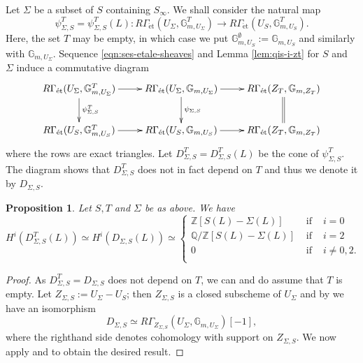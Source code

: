 \documentclass[12pt]{amsart}
\theoremstyle{plain}
\newtheorem{prop}[theorem]{Proposition}
\theoremstyle{remark}
\theoremstyle{definition}
\numberwithin{equation}{section}
\begin{document}
{Let $\Sigma$ be a subset of $S$ containing $S_{\infty}$.
We shall consider the natural map 
\begin{equation}\label{eqn:define-psi}
\psi_{\Sigma,S}^{T} = \psi_{\Sigma,S}^{T}(L):
R\Gamma_{\mathrm{\acute{e}t}}(U_{\Sigma}, \mathbb{G}_{m, U_{\Sigma}}^{T}) \longrightarrow R\Gamma_{\mathrm{\acute{e}t}}(U_{S}, \mathbb{G}_{m, U_{S}}^{T}).
\end{equation}
Here, the set $T$ may be empty, in which case we put $\mathbb{G}_{m, U_{S}}^{\emptyset} := \mathbb{G}_{m, U_{S}}$ 
and similarly with $\mathbb{G}_{m, U_{\Sigma}}$.
Sequence \eqref{eqn:ses-etale-sheaves} and Lemma \ref{lem:qis-i-zt} for $S$ and $\Sigma$ 
induce a commutative diagram
\begin{equation}\label{eqn:change-sigma-to-S}
\xymatrix{
{R\Gamma_{\mathrm{\acute{e}t}}(U_{\Sigma}, \mathbb{G}_{m, U_{\Sigma}}^{T})} \ar[r] \ar[d]^{\psi_{\Sigma,S}^{T}} &
R\Gamma_{\mathrm{\acute{e}t}}(U_{\Sigma}, \mathbb{G}_{m, U_{\Sigma}}) \ar[r] \ar[d]^{\psi_{\Sigma,S}} & R\Gamma_{\mathrm{\acute{e}t}}(Z_{T}, \mathbb{G}_{m,Z_{T}}) \ar@{=}[d]\\
{R\Gamma_{\mathrm{\acute{e}t}}(U_{S}, \mathbb{G}_{m, U_{S}}^{T})} \ar[r] &
R\Gamma_{\mathrm{\acute{e}t}}(U_{S}, \mathbb{G}_{m, U_{S}}) \ar[r] & R\Gamma_{\mathrm{\acute{e}t}}(Z_{T}, \mathbb{G}_{m,Z_{T}})
} 
\end{equation}
where the rows are exact triangles.
Let $D_{\Sigma,S}^{T} = D_{\Sigma,S}^{T}(L)$ be the cone of $\psi_{\Sigma,S}^{T}$. The diagram shows that
$D_{\Sigma,S}^{T}$ does not in fact depend on $T$ and thus we denote it by $D_{\Sigma,S}$.

\begin{prop}\label{prop:cohomology-of-cone}
Let $S,T$ and $\Sigma$ be as above. We have
\[
H^{i}(D_{\Sigma,S}^{T}(L)) \simeq H^{i}(D_{\Sigma,S}(L)) \simeq \left\{
\begin{array}{lll}
{\mathbb{Z}}[S(L)-\Sigma(L)] & \mbox{ if } & i=0\\
{\mathbb{Q}} / {\mathbb{Z}}[S(L)-\Sigma(L)] & \mbox{ if } & i=2\\
0 & \mbox{ if } & i\not=0,2.\\
\end{array}
\right.
\]
\end{prop}

\begin{proof}
As $D_{\Sigma,S}^{T}=D_{\Sigma,S}$ does not depend on $T$, we can and do assume that $T$ is empty.
Let $Z_{\Sigma,S} := U_{\Sigma} - U_{S}$; then $Z_{\Sigma,S}$ is a closed subscheme of $U_{\Sigma}$ and
by \cite[Chapter III, Proposition 1.25]{MR559531} we have an isomorphism
\[
D_{\Sigma,S} \simeq R\Gamma_{Z_{\Sigma,S}}(U_{\Sigma}, \mathbb{G}_{m, U_{\Sigma}})[-1],
\]
where the righthand side denotes cohomology with support on $Z_{\Sigma,S}$.
We now apply \cite[Chapter III, Corollary 1.28]{MR559531} and \cite[Chapter II, Proposition 1.5]{MR2261462} to
obtain the desired result.
\end{proof}

}
\end{document}
